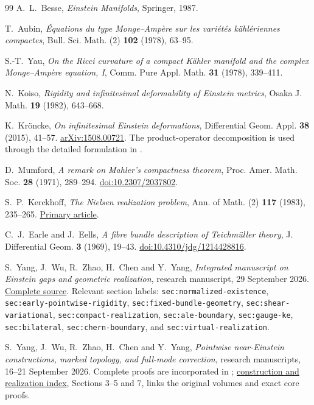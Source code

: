 \documentclass[11pt,a4paper]{article}
\theoremstyle{definition}\newtheorem{definition}[theorem]{Definition}
\theoremstyle{remark}\newtheorem{remark}[theorem]{Remark}
\newcommand{\repo}[2]{\href{https://github.com/Cherish0925/Geometric-Analysis/blob/main/#1}{#2}}
\begin{document}
\begin{thebibliography}{99}
A.~L.~Besse, \emph{Einstein Manifolds}, Springer, 1987.

T.~Aubin, \emph{\'Equations du type Monge--Amp\`ere sur les vari\'et\'es k\"ahl\'eriennes compactes}, Bull. Sci. Math. (2) \textbf{102} (1978), 63--95.

S.-T.~Yau, \emph{On the Ricci curvature of a compact K\"ahler manifold and the complex Monge--Amp\`ere equation, I}, Comm. Pure Appl. Math. \textbf{31} (1978), 339--411.

N.~Koiso, \emph{Rigidity and infinitesimal deformability of Einstein metrics}, Osaka J. Math. \textbf{19} (1982), 643--668.

K.~Kr\"oncke, \emph{On infinitesimal Einstein deformations}, Differential Geom. Appl. \textbf{38} (2015), 41--57. \href{https://arxiv.org/abs/1508.00721}{arXiv:1508.00721}. The product-operator decomposition is used through the detailed formulation in \cite{source-kernel}.

D.~Mumford, \emph{A remark on Mahler's compactness theorem}, Proc. Amer. Math. Soc. \textbf{28} (1971), 289--294. \href{https://doi.org/10.2307/2037802}{doi:10.2307/2037802}.

S.~P.~Kerckhoff, \emph{The Nielsen realization problem}, Ann. of Math. (2) \textbf{117} (1983), 235--265. \href{https://annals.math.princeton.edu/1983/117-2/p02}{Primary article}.

C.~J.~Earle and J.~Eells, \emph{A fibre bundle description of Teichm\"uller theory}, J. Differential Geom. \textbf{3} (1969), 19--43. \href{https://doi.org/10.4310/jdg/1214428816}{doi:10.4310/jdg/1214428816}.

S.~Yang, J.~Wu, R.~Zhao, H.~Chen and Y.~Yang, \emph{Integrated manuscript on Einstein gaps and geometric realization}, research manuscript, 29 September 2026. \repo{archive/originals/2026-09-29/27b3cef6-aeed-442c-9e66-fef1a757828e.tex}{Complete source}. Relevant section labels: \texttt{sec:normalized-existence}, \texttt{sec:early-pointwise-rigidity}, \texttt{sec:fixed-bundle-geometry}, \texttt{sec:shear-variational}, \texttt{sec:compact-realization}, \texttt{sec:ale-boundary}, \texttt{sec:gauge-ke}, \texttt{sec:bilateral}, \texttt{sec:chern-boundary}, and \texttt{sec:virtual-realization}.

S.~Yang, J.~Wu, R.~Zhao, H.~Chen and Y.~Yang, \emph{Pointwise near-Einstein constructions, marked topology, and full-mode correction}, research manuscripts, 16--21 September 2026. Complete proofs are incorporated in \cite{source-integrated}; \repo{docs/CONSTRUCTIONS_AND_REALIZATION.md}{construction and realization index}, Sections 3--5 and 7, links the original volumes and exact core proofs.


\end{thebibliography}
\end{document}
